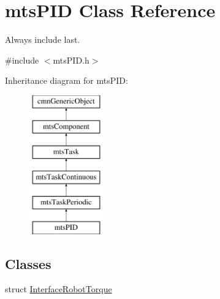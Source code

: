 \hypertarget{classmts_p_i_d}{}\section{mts\+P\+I\+D Class Reference}
\label{classmts_p_i_d}


Always include last.  




{\ttfamily \#include $<$mts\+P\+I\+D.\+h$>$}

Inheritance diagram for mts\+P\+I\+D\+:\begin{figure}[H]
\begin{center}
\leavevmode
\includegraphics[height=6.000000cm]{de/d85/classmts_p_i_d}
\end{center}
\end{figure}
\subsection*{Classes}
\begin{DoxyCompactItemize}
\item 
struct \hyperlink{structmts_p_i_d_1_1_interface_robot_torque}{Interface\+Robot\+Torque}
\end{DoxyCompactItemize}
